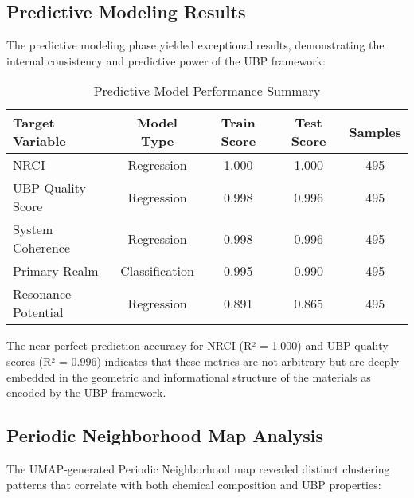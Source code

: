 \documentclass[12pt,a4paper]{article}
\begin{document}
\subsection{Predictive Modeling Results}

The predictive modeling phase yielded exceptional results, demonstrating the internal consistency and predictive power of the UBP framework:

\begin{table}[H]
\centering
\caption{Predictive Model Performance Summary}
\label{tab:model_performance}
\begin{tabular}{@{}lcccc@{}}
\toprule
\textbf{Target Variable} & \textbf{Model Type} & \textbf{Train Score} & \textbf{Test Score} & \textbf{Samples} \\
\midrule
NRCI & Regression & 1.000 & 1.000 & 495 \\
UBP Quality Score & Regression & 0.998 & 0.996 & 495 \\
System Coherence & Regression & 0.998 & 0.996 & 495 \\
Primary Realm & Classification & 0.995 & 0.990 & 495 \\
Resonance Potential & Regression & 0.891 & 0.865 & 495 \\
\bottomrule
\end{tabular}
\end{table}

The near-perfect prediction accuracy for NRCI (R² = 1.000) and UBP quality scores (R² = 0.996) indicates that these metrics are not arbitrary but are deeply embedded in the geometric and informational structure of the materials as encoded by the UBP framework.

\subsection{Periodic Neighborhood Map Analysis}

The UMAP-generated Periodic Neighborhood map revealed distinct clustering patterns that correlate with both chemical composition and UBP properties:
\end{document}

